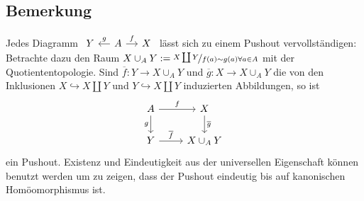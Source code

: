 \subsection[Bemerkung zur Existenz und zur Eindeutigkeit des Pushouts]{Bemerkung} %
\label{sub:112}
Jedes Diagramm $\begin{tikzcd}[sep=small]
		Y & A \rar["f"] \lar["g"']& X 
	\end{tikzcd}$ lässt sich zu einem Pushout vervollständigen:
Betrachte dazu den Raum $X \cup_A Y := \nicefrac{X \coprod Y}{f(a) \sim g(a) \forall a \in A}$ mit der Quotiententopologie. Sind $\overline{f}\colon Y \to X \cup_A Y $  und 
$\overline{g}\colon X \to X \cup_A Y$ die von den Inklusionen $X \hookrightarrow X \coprod Y$ und $Y \hookrightarrow X \coprod Y$ induzierten Abbildungen, so ist 
\[
	\begin{tikzcd}[]
		A \rar["f"] \dar["g"'] & X \dar["\overline{g}"] \\
		Y \rar["\overline{f}"] & X \cup_A Y
	\end{tikzcd}
\]
ein Pushout. 
Existenz und Eindeutigkeit aus der universellen Eigenschaft können benutzt werden um zu zeigen, dass der Pushout eindeutig bis auf kanonischen Homöomorphismus ist.


